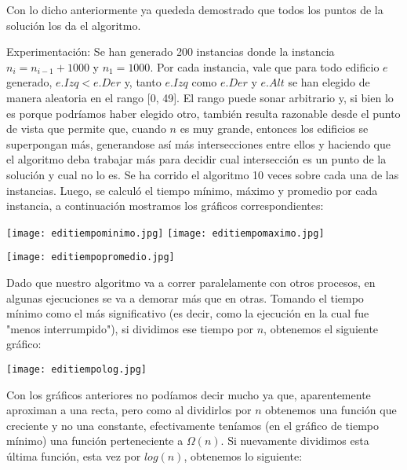 \documentclass{article}
\begin{document}
Con lo dicho anteriormente ya quededa demostrado que todos los puntos de la solución los da el algoritmo.




\newpage
{\noindent \Huge Experimentaci\'on:}
\newline \newline Se han generado 200 instancias donde la instancia $n_i = n_{i-1} + 1000$ y $n_1 = 1000$. Por cada instancia, vale que para todo edificio $e$ generado, $e.Izq < e.Der$ y, tanto $e.Izq$ como $e.Der$ y $e.Alt$ se han elegido de manera aleatoria en el rango [0, 49]. El rango puede sonar arbitrario y, si bien lo es porque podr\'iamos haber elegido otro, tambi\'en resulta razonable desde el punto de vista que permite que, cuando $n$ es muy grande, entonces los edificios se superpongan m\'as, generandose as\'i m\'as intersecciones entre ellos y haciendo que el algoritmo deba trabajar m\'as para decidir cual intersecci\'on es un punto de la soluci\'on y cual no lo es.
\newline Se ha corrido el algoritmo 10 veces sobre cada una de las instancias. Luego, se calcul\'o el tiempo m\'inimo, m\'aximo y promedio por cada instancia, a continuaci\'on mostramos los gr\'aficos correspondientes:

\vspace{2cm}
\texttt{[image: editiempominimo.jpg]}
\texttt{[image: editiempomaximo.jpg]}

\texttt{[image: editiempopromedio.jpg]}

\vspace{2cm}
Dado que nuestro algoritmo va a correr paralelamente con otros procesos, en algunas ejecuciones se va a demorar m\'as que en otras. Tomando el tiempo m\'inimo como el m\'as significativo (es decir, como la ejecuci\'on en la cual fue "menos interrumpido"), si dividimos ese tiempo por $n$, obtenemos el siguiente gr\'afico:

\texttt{[image: editiempolog.jpg]}

Con los gr\'aficos anteriores no pod\'iamos decir mucho ya que, aparentemente aproximan a una recta, pero como al dividirlos por $n$ obtenemos una funci\'on que creciente y no una constante, efectivamente ten\'iamos (en el gr\'afico de tiempo m\'inimo) una funci\'on perteneciente a $\Omega(n)$.
\newline Si nuevamente dividimos esta \'ultima funci\'on, esta vez por $log(n)$, obtenemos lo siguiente:
\end{document}
